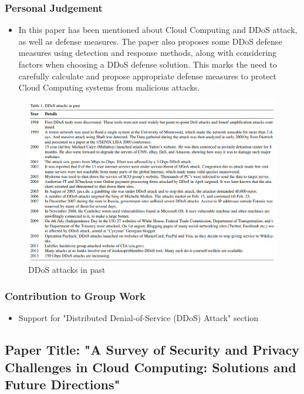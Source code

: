 \documentclass[12pt, twoside]{article}
\begin{document}
\subsubsection{Personal Judgement}
\begin{itemize}
    \item In this paper has been mentioned about Cloud Computing and DDoS attack, as well as defense measures. The paper also proposes some DDoS defense measures using detection and response methods, along with considering factors when choosing a DDoS defense solution. This marks the need to carefully calculate and propose appropriate defense measures to protect Cloud Computing systems from malicious attacks.
\end{itemize}





\begin{figure}[H]
    \centering
    \includegraphics[scale = 0.5]{DDoS.png}
    \caption{DDoS attacks in past}
\end{figure}




\subsubsection{Contribution to Group Work}
\begin{itemize}
    \item Support for "Distributed Denial-of-Service (DDoS) Attack" section
\end{itemize}
\subsection{Paper Title: "A Survey of Security and Privacy Challenges in Cloud Computing: Solutions and Future Directions" \cite{liu2015survey}}
\end{document}
